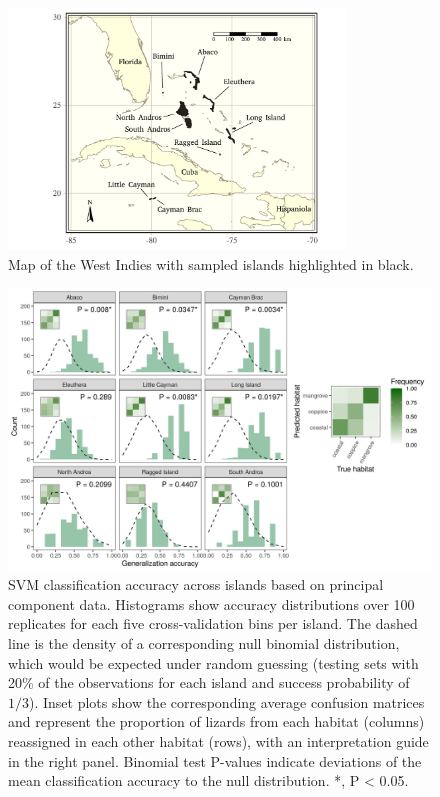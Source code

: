 \begin{figure}[H]
    \centering
	\includegraphics[width=0.8\textwidth]{../maps/map.pdf}
	\caption{Map of the West Indies with sampled islands highlighted in black.}
	\label{fig:map}
\end{figure}

\begin{figure}[H]
	\centering
	\includegraphics[width=\textwidth]{"../analyses/04-machine learning/plots/classif_svm_pca"}
	\caption{SVM classification accuracy across islands based on principal component data. Histograms show accuracy distributions over 100 replicates for each five cross-validation bins per island. The dashed line is the density of a corresponding null binomial distribution, which would be expected under random guessing (testing sets with 20\% of the observations for each island and success probability of $1/3$). Inset plots show the corresponding average confusion matrices and represent the proportion of lizards from each habitat (columns) reassigned in each other habitat (rows), with an interpretation guide in the right panel. Binomial test P-values indicate deviations of the mean classification accuracy to the null distribution. *, P < 0.05.}
	\label{fig:classif-svm-pca}
\end{figure}


